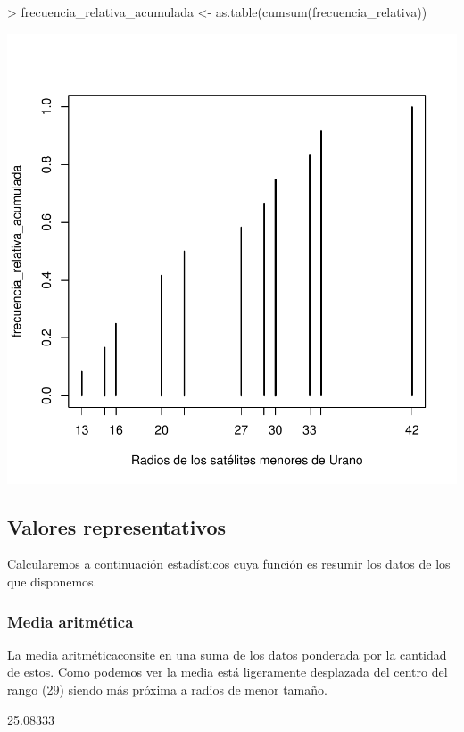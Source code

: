 \documentclass [a4paper] {article}
\begin{document}
\begin{Schunk}
\begin{Sinput}
> frecuencia_relativa_acumulada <- as.table(cumsum(frecuencia_relativa))
\end{Sinput}
\end{Schunk}
\begin{center}
\includegraphics{entrega-frecuencia_relativa_acumulada_satelites_plot}
\end{center}

\newpage
\subsection{Valores representativos}
Calcularemos a continuación estadísticos cuya función es resumir los datos de los que disponemos.

\subsubsection{Media aritmética}
La media aritméticaconsite en una suma de los datos ponderada por la cantidad de estos.
Como podemos ver la media está ligeramente desplazada del centro del rango (29) siendo más próxima a radios de menor tamaño.

\begin{Schunk}
\begin{Soutput}
[1] 25.08333
\end{Soutput}
\end{Schunk}
\end{document}
